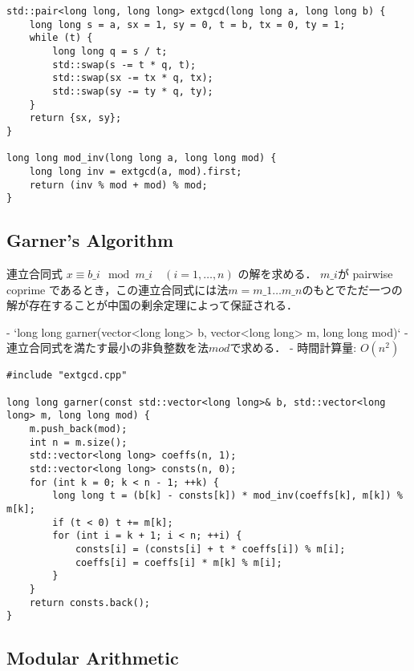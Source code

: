 \begin{lstlisting}
std::pair<long long, long long> extgcd(long long a, long long b) {
    long long s = a, sx = 1, sy = 0, t = b, tx = 0, ty = 1;
    while (t) {
        long long q = s / t;
        std::swap(s -= t * q, t);
        std::swap(sx -= tx * q, tx);
        std::swap(sy -= ty * q, ty);
    }
    return {sx, sy};
}

long long mod_inv(long long a, long long mod) {
    long long inv = extgcd(a, mod).first;
    return (inv % mod + mod) % mod;
}
\end{lstlisting}

\subsection{Garner's Algorithm}

\begin{small}
\begin{markdown}
連立合同式 $x \equiv b\_i \mod m\_i \quad (i=1,\dots,n)$ の解を求める．
$m\_i$が pairwise coprime であるとき，この連立合同式には法$m = m\_1\dots m\_n$のもとでただ一つの解が存在することが中国の剰余定理によって保証される．

- `long long garner(vector<long long> b, vector<long long> m, long long mod)`
    - 連立合同式を満たす最小の非負整数を法$mod$で求める．
    - 時間計算量: $O(n^2)$
\end{markdown}
\end{small}

\begin{lstlisting}
#include "extgcd.cpp"

long long garner(const std::vector<long long>& b, std::vector<long long> m, long long mod) {
    m.push_back(mod);
    int n = m.size();
    std::vector<long long> coeffs(n, 1);
    std::vector<long long> consts(n, 0);
    for (int k = 0; k < n - 1; ++k) {
        long long t = (b[k] - consts[k]) * mod_inv(coeffs[k], m[k]) % m[k];
        if (t < 0) t += m[k];
        for (int i = k + 1; i < n; ++i) {
            consts[i] = (consts[i] + t * coeffs[i]) % m[i];
            coeffs[i] = coeffs[i] * m[k] % m[i];
        }
    }
    return consts.back();
}
\end{lstlisting}

\subsection{Modular Arithmetic}


